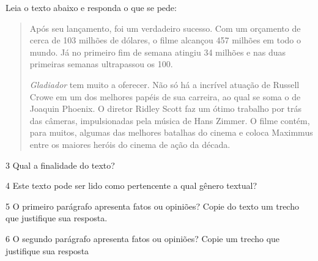 Leia o texto abaixo e responda o que se pede:

\begin{quote}

Após seu lançamento, foi um verdadeiro sucesso. Com um orçamento de
cerca de 103 milhões de dólares, o filme alcançou 457 milhões em todo o
mundo. Já no primeiro fim de semana atingiu 34 milhões e nas duas
primeiras semanas ultrapassou os 100.

\textit{Gladiador} tem muito a oferecer. Não só há a incrível atuação de Russell
Crowe em um dos melhores papéis de sua carreira, ao qual se soma o de
Joaquin Phoenix. O diretor Ridley Scott faz um ótimo trabalho por trás
das câmeras, impulsionadas pela música de Hans Zimmer. O filme contém,
para muitos, algumas das melhores batalhas do cinema e coloca Maximmus
entre os maiores heróis do cinema de ação da década.

\end{quote}


\num{3} Qual a finalidade do texto?


\num{4} Este texto pode ser lido como pertencente a qual gênero textual?


\num{5} O primeiro parágrafo apresenta fatos ou opiniões? Copie do texto um
trecho que justifique sua resposta.


\num{6} O segundo parágrafo apresenta fatos ou opiniões? Copie um trecho que 
justifique sua resposta


